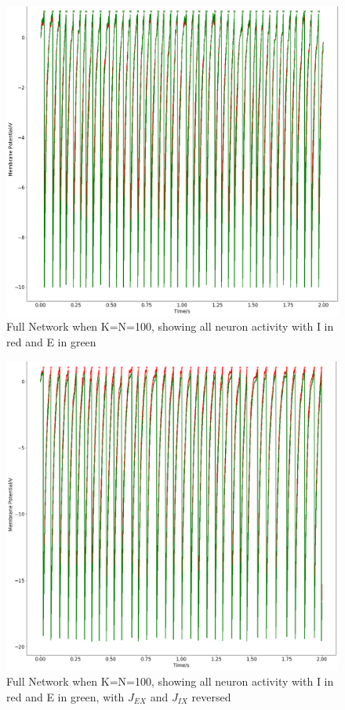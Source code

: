 \documentclass[twoside,twocolumn]{article}
\begin{document}
\begin{figure}[h]
  \centering
    \includegraphics[width=\linewidth]{k=n}
  \caption{Full Network when K=N=100, showing all neuron activity with I in red and E in green}
  \label{fig:nk}
\end{figure}

\begin{figure}[h]
  \centering
    \includegraphics[width=\linewidth]{5d}
  \caption{Full Network when K=N=100, showing all neuron activity with I in red and E in green, with $J_{EX}$ and $J_{IX}$ reversed}
  \label{fig:5d}
\end{figure}
\end{document}
